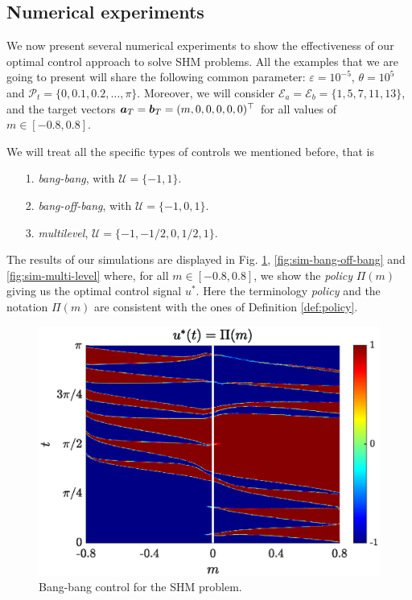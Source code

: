 \documentclass[twocolumn]{autart}    %
\begin{document}
\subsection{Numerical experiments}

We now present several numerical experiments to show the effectiveness of our optimal control approach to solve SHM problems. All the examples that we are going to present will share the following common parameter: $\varepsilon = 10^{-5}$, $\theta = 10^5$ and $\mathcal{P}_t = \{0,0.1,0.2,\dots,\pi\}$. Moreover, we will consider $\mathcal{E}_a = \mathcal{E}_b = \{1,5,7,11,13\}$, and the target vectors $\bm{a}_T = \bm{b}_T = (m,0,0,0,0,0)^\top$ for all values of $m \in [-0.8,0.8]$. 

We will treat all the specific types of controls we mentioned before, that is
\begin{itemize}
	\item[1.] \emph{bang-bang}, with $\mathcal{U} = \{-1,1\}$.
	\vspace{0.05cm}
	\item[2.] \emph{bang-off-bang}, with $\mathcal{U} = \{-1,0,1\}$. 
	\vspace{0.05cm}
	\item[3.] \textit{multilevel}, $\mathcal{U} = \{-1,-1/2,0,1/2,1\}$.
\end{itemize}

The results of our simulations are displayed in Fig. \ref{fig:sim-bang-bang}, \ref{fig:sim-bang-off-bang} and \ref{fig:sim-multi-level} where, for all $m \in [-0.8,0.8]$, we show the \textit{policy} $\Pi(m)$ giving us the optimal control signal $u^\ast$. Here the terminology \textit{policy} and the notation $\Pi(m)$ are consistent with the ones of Definition \ref{def:policy}.

\begin{figure}[ht!]
    \hspace{0.05em}
    \includegraphics[scale=0.525]{img/fig05.eps}
    \caption{Bang-bang control for the SHM problem.}\label{fig:sim-bang-bang}
\end{figure} 
\end{document}
